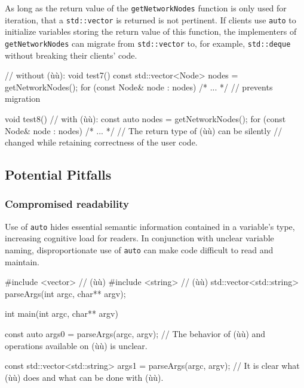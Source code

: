 \noindent As long as the return value of the \lstinline!getNetworkNodes! function is
only used for iteration, that a \lstinline!std::vector! is
returned is not pertinent. If clients use \lstinline!auto! to initialize
variables storing the return value of this function, the implementers of
\lstinline!getNetworkNodes! can migrate from \lstinline!std::vector! to,
for example, \lstinline!std::deque! without breaking their clients'
code.

\begin{emcppslisting}[emcppsbatch=e11]
// without (ù{}ù):
void test7()
{
    const std::vector<Node> nodes = getNetworkNodes();
    for (const Node& node : nodes) { /* ... */ }
        // prevents migration
}

void test8()
{
    // with (ù{}ù):
    const auto nodes = getNetworkNodes();
    for (const Node& node : nodes) { /* ... */ }
        // The return type of (ù{}ù) can be silently
        // changed while retaining correctness of the user code.
}
\end{emcppslisting}
    

\subsection[Potential Pitfalls]{Potential Pitfalls}\label{potential-pitfalls-auto}

\subsubsection[Compromised readability]{Compromised readability}\label{compromised-readability}

Use of \lstinline!auto! hides essential semantic information contained in a
variable's type, increasing cognitive load for readers. In conjunction
with unclear variable naming, disproportionate use of \lstinline!auto! can
make code difficult to read and maintain.

\begin{emcppshiddenlisting}[emcppsbatch=e12]
#include <vector>  // (ù{}ù)
#include <string>  // (ù{}ù)
std::vector<std::string> parseArgs(int argc, char** argv);
\end{emcppshiddenlisting}
\begin{emcppslisting}[emcppsbatch=e12]
int main(int argc, char** argv)
{
    const auto args0 = parseArgs(argc, argv);
        // The behavior of (ù{}ù) and operations available on (ù{}ù) is unclear.

    const std::vector<std::string> args1 = parseArgs(argc, argv);
        // It is clear what (ù{}ù) does and what can be done with (ù{}ù).
}
\end{emcppslisting}
    

